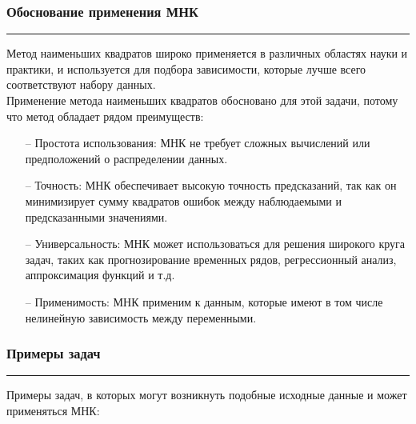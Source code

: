 \documentclass[a4paper, 14pt]{extarticle}
\begin{document}
\subsubsection*{{Обоснование применения МНК}}\vspace{-20pt}\rule{\linewidth}{0.1mm}

Метод наименьших квадратов широко применяется в различных областях науки и практики, 
и используется для подбора зависимости, которые лучше всего соответствуют набору данных. \\

Применение метода наименьших квадратов обосновано для этой задачи, потому что метод 
обладает рядом преимуществ: \\

\begin{itemize}
    \item[--] Простота использования: МНК не требует сложных вычислений или предположений о распределении данных. 
    \item[--] Точность: МНК обеспечивает высокую точность предсказаний, так как он минимизирует сумму квадратов ошибок между наблюдаемыми и предсказанными значениями.
    \item[--] Универсальность: МНК может использоваться для решения широкого круга задач, таких как прогнозирование временных рядов, регрессионный анализ, аппроксимация функций и т.д.
    \item[--] Применимость: МНК применим к данным, которые имеют в том числе нелинейную зависимость между переменными. 
\end{itemize}

\subsubsection*{{Примеры задач}}\vspace{-20pt}\rule{\linewidth}{0.1mm}

Примеры задач, в которых могут возникнуть подобные исходные данные и может применяться МНК: 
\end{document}
